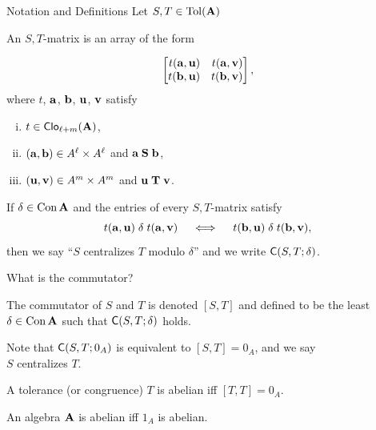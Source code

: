 \documentclass[notes=hide,12pt,xcolor=dvipsnames%
   ]{beamer}
\renewcommand{\defn}[1]{\alert{#1}}
\newcommand{\defin}[1]{\alert{#1}}
\newcommand{\medpause}{\pause\medskip}
\theoremstyle{definition}
\begin{document}
\begin{frame}[shrink=10,label=defs]{Notation and Definitions}%
  Let $S, T \in \operatorname{Tol}(\mathbf{A})$

  An \defin{$S,T$-matrix} is an array of the form

  \[
  \begin{bmatrix*}[r] t(\ba,\bu) & t(\ba,\bv)\\ t(\bb,\bu)&t(\bb,\bv)\end{bmatrix*},
  \]
  where $t$, $\mathbf{a}$, $\mathbf{b}$, $\mathbf{u}$, $\mathbf{v}$ satisfy
  \begin{enumerate}[(i)] %
  \item $t\in \operatorname{\mathsf{Clo}}_{\ell + m}(\mathbf{A})$,
  \item $(\mathbf{a}, \mathbf{b})\in A^\ell\times A^\ell$ and $\mathbf{a} \mathrel{\mathbf{S}} \mathbf{b}$,
  \item $(\mathbf{u}, \mathbf{v})\in A^m\times A^m$ and $\mathbf{u} \mathrel{\mathbf{T}} \mathbf{v}$.
  \end{enumerate}
\pause
  If $\delta \in \operatorname{Con} \mathbf{A}$ and the entries of every $S,T$-matrix satisfy
  \begin{equation}
    \label{eq:22}
    t(\mathbf{a},\mathbf{u}) \mathrel{\delta} t(\mathbf{a},\mathbf{v})\quad \iff \quad t(\mathbf{b},\mathbf{u}) \mathrel{\delta} t(\mathbf{b},\mathbf{v}),
  \end{equation}
  then we say ``\defn{$S$ centralizes $T$ modulo $\delta$}'' and we write
  $\mathsf{C}(S, T; \delta)$.
\end{frame}


\begin{frame}[label=defs]{What is the commutator?}

  The \defin{commutator of $S$ and $T$} is denoted $[S, T]$ and defined to be
  the least $\delta\in \operatorname{Con}\mathbf{A}$ such that $\mathsf{C}(S, T; \delta)$ holds.  

  \medpause
  
  Note that $\mathsf{C}(S, T; 0_A)$ is equivalent to $[S,T] = 0_A$,
  and we say\\[4pt] \defn{$S$ centralizes $T$}.

  \medpause
  
  A tolerance (or congruence) $T$ is \defin{abelian} iff $[T, T] = 0_A$.  

  An algebra $\mathbf{A}$ is \defin{abelian} iff $1_A$ is abelian.
\end{frame}

\end{document}
